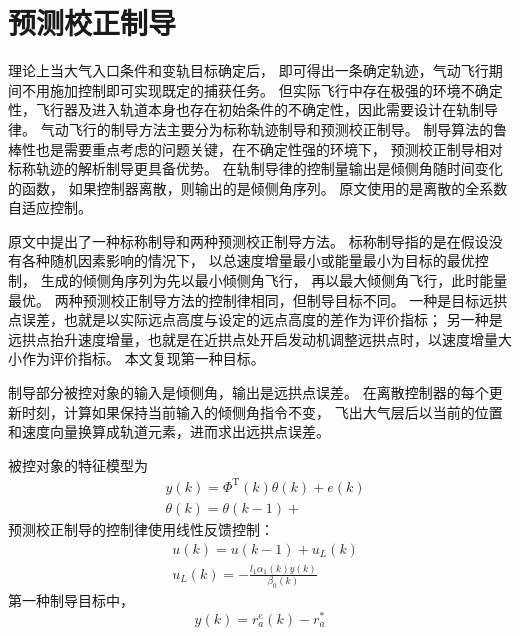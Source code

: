 \section{预测校正制导}
理论上当大气入口条件和变轨目标确定后，
即可得出一条确定轨迹，气动飞行期间不用施加控制即可实现既定的捕获任务。
但实际飞行中存在极强的环境不确定性，飞行器及进入轨道本身也存在初始条件的不确定性，因此需要设计在轨制导律。
气动飞行的制导方法主要分为标称轨迹制导和预测校正制导。
制导算法的鲁棒性也是需要重点考虑的问题关键，在不确定性强的环境下，
预测校正制导相对标称轨迹的解析制导更具备优势\cite{dqingyuan2019}。
在轨制导律的控制量输出是倾侧角随时间变化的函数，
如果控制器离散，则输出的是倾侧角序列。
原文使用的是离散的全系数自适应控制。

原文中提出了一种标称制导和两种预测校正制导方法。
标称制导指的是在假设没有各种随机因素影响的情况下，
以总速度增量最小或能量最小为目标的最优控制，
生成的倾侧角序列为先以最小倾侧角飞行，
再以最大倾侧角飞行，此时能量最优。
两种预测校正制导方法的控制律相同，但制导目标不同。
一种是目标远拱点误差，也就是以实际远点高度与设定的远点高度的差作为评价指标；
另一种是远拱点抬升速度增量，也就是在近拱点处开启发动机调整远拱点时，以速度增量大小作为评价指标。
本文复现第一种目标。

制导部分被控对象的输入是倾侧角，输出是远拱点误差。
在离散控制器的每个更新时刻，计算如果保持当前输入的倾侧角指令不变，
飞出大气层后以当前的位置和速度向量换算成轨道元素，进而求出远拱点误差。

被控对象的特征模型为
\begin{align*}
    &y(k) = \Phi^{\text{T}}(k)\theta(k) + e(k) \\
    &\theta(k) = \theta(k-1) + 
\end{align*}
预测校正制导的控制律使用线性反馈控制：
\begin{align*}
    &u(k) = u(k-1) + u_L(k) \\
    &u_L(k) = -\frac{l_1\alpha_1(k)y(k)}{\beta_0(k)}
\end{align*}
第一种制导目标中，
\begin{equation*}
    y(k) = r_a^e(k) - r_a^*
\end{equation*}


